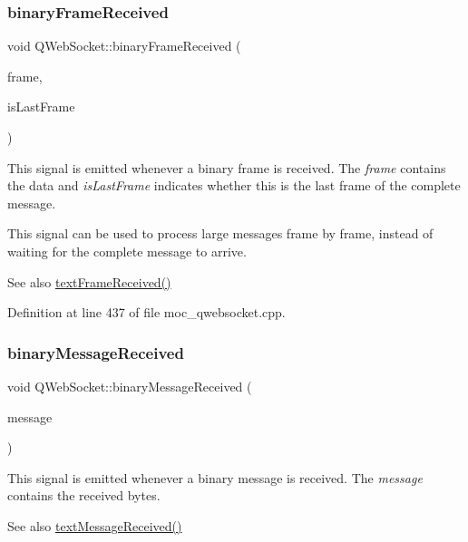\subsubsection{\texorpdfstring{binary\+Frame\+Received}{binaryFrameReceived}}
{\footnotesize\ttfamily void Q\+Web\+Socket\+::binary\+Frame\+Received (\begin{DoxyParamCaption}\item[{const Q\+Byte\+Array \&}]{frame,  }\item[{bool}]{is\+Last\+Frame }\end{DoxyParamCaption})\hspace{0.3cm}{\ttfamily [signal]}}

This signal is emitted whenever a binary frame is received. The {\itshape frame} contains the data and {\itshape is\+Last\+Frame} indicates whether this is the last frame of the complete message.

This signal can be used to process large messages frame by frame, instead of waiting for the complete message to arrive.

\begin{DoxySeeAlso}{See also}
\mbox{\hyperlink{class_q_web_socket_af0feabc8f7979f054b15d903a54882a6}{text\+Frame\+Received()}} 
\end{DoxySeeAlso}


Definition at line 437 of file moc\+\_\+qwebsocket.\+cpp.

\mbox{\label{class_q_web_socket_aaefdf77b949880d571e64a30b01f75e7}} 
\subsubsection{\texorpdfstring{binary\+Message\+Received}{binaryMessageReceived}}
{\footnotesize\ttfamily void Q\+Web\+Socket\+::binary\+Message\+Received (\begin{DoxyParamCaption}\item[{const Q\+Byte\+Array \&}]{message }\end{DoxyParamCaption})\hspace{0.3cm}{\ttfamily [signal]}}

This signal is emitted whenever a binary message is received. The {\itshape message} contains the received bytes.

\begin{DoxySeeAlso}{See also}
\mbox{\hyperlink{class_q_web_socket_ad0f93d1bf2b5e973dbc3acc4378505e4}{text\+Message\+Received()}} 
\end{DoxySeeAlso}


